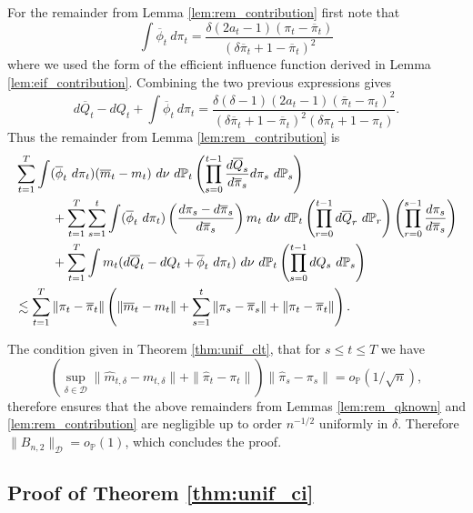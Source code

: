 \documentclass[12pt]{article}
\newcommand{\Pb}{\mathbb{P}}
\theoremstyle{remark}
\begin{document}
For the remainder from Lemma \ref{lem:rem_contribution} first note that
$$ \int \overline\phi_t \ d\pi_t = \frac{\delta (2 a_t-1) (\pi_t-\overline\pi_t)}{(\delta \overline\pi_t + 1-\overline\pi_t)^2}  $$
where we used the form of the efficient influence function derived in Lemma \ref{lem:eif_contribution}. Combining the two previous expressions gives
$$ d\overline{Q}_t - dQ_t + \int \overline\phi_t \ d\pi_t = \frac{\delta(\delta-1)(2 a_t - 1) (\overline\pi_t-\pi_t)^2}{ (\delta \overline\pi_t + 1-\overline\pi_t)^2 (\delta \pi_t + 1-\pi_t)} . $$
Thus the remainder from Lemma \ref{lem:rem_contribution} is
\begin{align*}
&\sum_{t=1}^T \int (\overline\phi_t \ d\pi_t) (\overline{m}_t - m_t) \ d\nu \ d\Pb_t \left( \prod_{s=0}^{t-1}  \frac{ d\overline{Q}_s }{ d\overline\pi_s } d\pi_s \ d\Pb_s \right) \\
& \hspace{.4in} + \sum_{t=1}^T \sum_{s=1}^t \int (\overline\phi_t \ d\pi_t) \left( \frac{d\pi_s-d\overline\pi_s}{d\overline\pi_s} \right)  m_t \ d\nu \ d\Pb_t \left( \prod_{r=0}^{t-1} d\overline{Q}_r \ d\Pb_r \right) \left( \prod_{r=0}^{s-1}  \frac{ d\pi_s }{ d\overline\pi_s } \right) \\
& \hspace{.4in} + \sum_{t=1}^T \int  m_t (d\overline{Q}_t - dQ_t + \overline\phi_t \ d\pi_t) \ d\nu \ d\Pb_t \left( \prod_{s=0}^{t-1} dQ_s  \ d\Pb_s \right) \\
& \lesssim \sum_{t=1}^T  \| \pi_t - \overline\pi_t \| \left( \| \overline{m}_t - m_t \|  + \sum_{s=1}^t \| \pi_s - \overline\pi_s \| + \| \pi_t - \overline\pi_t \| \right) .
\end{align*}

The condition given in Theorem \ref{thm:unif_clt}, that for $s \leq t \leq T$ we have
$$ \left( \sup_{\delta \in \mathcal{D}} \| \hat{m}_{t,\delta} - m_{t,\delta} \| + \| \hat\pi_t - \pi_t \| \right) \| \hat\pi_s - \pi_s \| = o_\Pb(1/\sqrt{n}) , $$
therefore ensures that the above remainders from Lemmas \ref{lem:rem_qknown} and \ref{lem:rem_contribution} are negligible up to order $n^{-1/2}$ uniformly in $\delta$. Therefore $\| B_{n,2} \|_\mathcal{D}=o_\Pb(1)$, which concludes the proof.

\subsection{Proof of Theorem \ref{thm:unif_ci}}
\label{proof:unif_ci}
\end{document}

